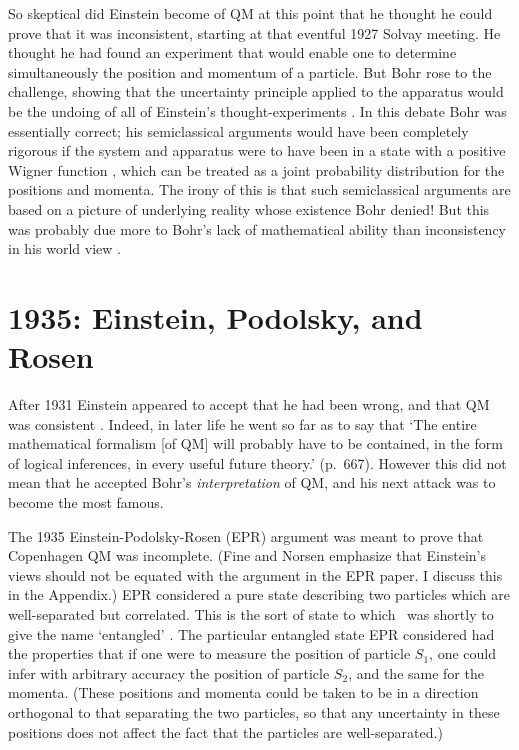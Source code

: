 \documentclass[12pt]{iopart}
\begin{document}
So skeptical did Einstein become of QM at this point that he thought he could 
prove that it was inconsistent, starting at that eventful 1927 Solvay meeting.   
He thought he had found an 
experiment that would enable one to determine simultaneously the
position and momentum of a particle. But Bohr rose to the challenge, showing that the
uncertainty principle applied to the apparatus would be the undoing
of all of Einstein's thought-experiments \cite{BohrEinst}.
 In this debate Bohr was essentially correct;  his semiclassical arguments  
 would have been completely rigorous if the system and apparatus were
 to have been in a state with a positive Wigner function  \cite{Wig32}, which can be treated as a joint 
  probability distribution for the positions and momenta.  
  The irony of this is that such semiclassical arguments 
are based on a picture of underlying reality whose existence Bohr denied! But this was
probably due more to Bohr's lack of mathematical ability than inconsistency 
in his world view \cite{Bel99}. 


\section{1935: Einstein, Podolsky, and Rosen} \label{sec:EPR}
  
  After 1931 Einstein appeared to accept
  that he had been wrong, and that QM was consistent \cite{Pai82}. 
  Indeed, in later life he went so far as to say that
`The entire mathematical formalism [of QM] will probably have
to be contained, in the form of logical inferences, in every useful future theory.'
\cite{Ein49} (p.~667). However this did not mean that he accepted Bohr's {\em interpretation} of QM,
and   his next attack was to become the most famous. 

 The 1935 Einstein-Podolsky-Rosen (EPR) argument \cite{EinPodRos35}
  was meant to prove that Copenhagen QM was incomplete. (Fine \cite{Fin96} and Norsen \cite{Nor05} emphasize that Einstein's views should not be equated with the argument in the EPR paper. I discuss this 
  in the Appendix.) 
EPR considered a pure state describing two particles which are well-separated but   
correlated. This is the sort of state to which \sch\  
was shortly to give the name `entangled' \cite{Sch35}.
 The particular entangled state EPR considered had the properties that 
if one were to measure the position of particle $S_1$, one could infer with arbitrary accuracy 
the position of particle $S_2$, and the same for the momenta. (These positions and momenta could be taken to be in a direction orthogonal to that separating the two particles, so that any uncertainty in these positions does not affect the fact that the particles are well-separated.) 
\end{document}
